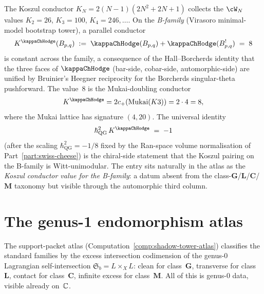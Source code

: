 \begin{remark}[$K^{\kappaChHodge} = 8$ on the B-family]
\label{rem:rosetta-Kkappa-eight}
%
%
The Koszul conductor $K_N = 2(N-1)(2N^2+2N+1)$ collects the
$\cW_N$ values $K_2 = 26$, $K_3 = 100$, $K_4 = 246,\ldots$\@. On the
\emph{B-family} (Virasoro minimal-model bootstrap tower), a
parallel conductor
\[
K^{\kappaChHodge}(B_{p,q})
\;:=\;
\kappaChHodge(B_{p,q}) + \kappaChHodge(B_{p,q}^!)
\;=\;
8
\]
is constant across the family, a consequence of the Hall--Borcherds
identity that the three faces of $\kappaChHodge$ (bar-side,
cobar-side, automorphic-side) are unified by Bruinier's Heegner
reciprocity for the Borcherds singular-theta pushforward. The
value~$8$ is the Mukai-doubling conductor
\[
K^{\kappaChHodge}
=2c_+(\mathrm{Mukai}(K3))
=2\cdot4
=8,
\]
where the Mukai lattice has signature $(4,20)$. The
universal identity
\[
\hbar_{\mathrm{QG}}^{2}\,K^{\kappaChHodge} \;=\; -1
\]
\textup{(}after the scaling $\hbar_{\mathrm{QG}}^2 = -1/8$ fixed by the
Ran-space volume normalisation of Part~\ref{part:swiss-cheese}\textup{)}
is the chiral-side statement that the Koszul pairing on the
B-family is Witt-unimodular. The entry sits naturally in the atlas
as the \emph{Koszul conductor value for the B-family}: a datum
absent from the class-$\mathbf{G}$/$\mathbf{L}$/$\mathbf{C}$/$\mathbf{M}$
taxonomy but visible through the automorphic third column.
\end{remark}

\section{The genus-1 endomorphism atlas}%
\label{sec:genus1-endomorphism-atlas}%
%
%

\providecommand{\Mvac}{\cM_{\mathrm{vac}}}
\providecommand{\Mbar}{\overline{\mathcal{M}}}
\providecommand{\HH}{\operatorname{HH}}
\providecommand{\End}{\operatorname{End}}

The support-packet atlas
(Computation~\ref{comp:shadow-tower-atlas}) classifies the
standard families by the excess intersection codimension of
the genus-$0$ Lagrangian self-intersection
$\mathfrak{S}_b = L \times_X L$: clean for class~$\mathbf{G}$,
transverse for class~$\mathbf{L}$, contact for
class~$\mathbf{C}$, infinite excess for class~$\mathbf{M}$.
All of this is genus-$0$ data, visible already on~$\mathbb{C}$.

